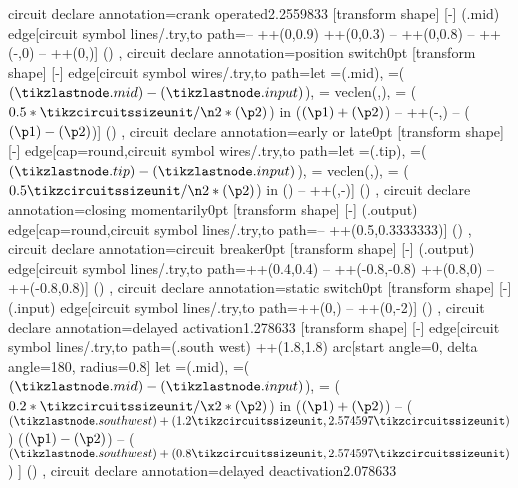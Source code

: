 {  circuit declare annotation={crank operated}{2.2559833\tikzcircuitssizeunit}
  {
    [transform shape]
    [-]
    (\tikzlastnode.mid) edge[circuit symbol lines/.try,to path={-- ++(0,0.9\tikzcircuitssizeunit) ++(0,0.3\tikzcircuitssizeunit) -- ++(0,0.8\tikzcircuitssizeunit)  -- ++(-\tikzcircuitssizeunit,0)  -- ++(0,\tikzcircuitssizeunit)}] ()
  },
  circuit declare annotation={position switch}{0pt}
  {
    [transform shape]
    [-]
    edge[circuit symbol wires/.try,to path={let =(\tikzlastnode.mid), =($(\tikzlastnode.mid) - (\tikzlastnode.input)$),  = {veclen(,)}, = ($0.5*\tikzcircuitssizeunit/\n2*(\p2)$) in ($(\p1)+(\p2)$) -- ++(-,) -- ($(\p1)-(\p2)$)}] ()
  },
  circuit declare annotation={early or late}{0pt}
  {
    [transform shape]
    [-]
    edge[cap=round,circuit symbol wires/.try,to path={let =(\tikzlastnode.tip), =($(\tikzlastnode.tip) - (\tikzlastnode.input)$),  = {veclen(,)}, = ($0.5\tikzcircuitssizeunit/\n2*(\p2)$) in () -- ++(,-)}] ()
  },
  circuit declare annotation={closing momentarily}{0pt}
  {
    [transform shape]
    [-]
    (\tikzlastnode.output) edge[cap=round,circuit symbol lines/.try,to path={-- ++(0.5\tikzcircuitssizeunit,0.3333333\tikzcircuitssizeunit)}] ()
  },
  circuit declare annotation={circuit breaker}{0pt}
  {
    [transform shape]
    [-]
    (\tikzlastnode.output) edge[circuit symbol lines/.try,to path={++(0.4\tikzcircuitssizeunit,0.4\tikzcircuitssizeunit) -- ++(-0.8\tikzcircuitssizeunit,-0.8\tikzcircuitssizeunit) ++(0.8\tikzcircuitssizeunit,0) -- ++(-0.8\tikzcircuitssizeunit,0.8\tikzcircuitssizeunit)}] ()
  },
  circuit declare annotation={static switch}{0pt}
  {
    [transform shape]
    [-]
    (\tikzlastnode.input) edge[circuit symbol lines/.try,to path={++(0,\tikzcircuitssizeunit) -- ++(0,-2\tikzcircuitssizeunit)}] ()
  },
  circuit declare annotation={delayed activation}{1.278633\tikzcircuitssizeunit}
  {
    [transform shape]
    [-]
    edge[circuit symbol lines/.try,to path={(\tikzlastnode.south west) ++(1.8\tikzcircuitssizeunit,1.8\tikzcircuitssizeunit) arc[start angle=0, delta angle=180, radius=0.8\tikzcircuitssizeunit] let =(\tikzlastnode.mid), =($(\tikzlastnode.mid) - (\tikzlastnode.input)$),  = ($0.2*\tikzcircuitssizeunit/\x2*(\p2)$) in ($(\p1)+(\p2)$) -- ($(\tikzlastnode.south west) + (1.2\tikzcircuitssizeunit,2.574597\tikzcircuitssizeunit)$) ($(\p1)-(\p2)$) -- ($(\tikzlastnode.south west) + (0.8\tikzcircuitssizeunit,2.574597\tikzcircuitssizeunit)$)} ] ()
  },
  circuit declare annotation={delayed deactivation}{2.078633\tikzcircuitssizeunit}
}
